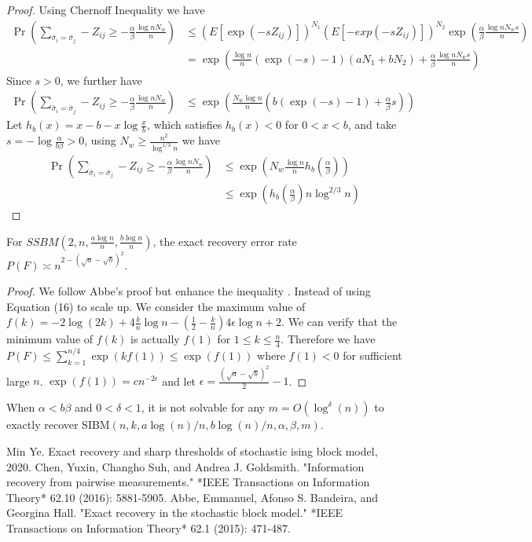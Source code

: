 \documentclass{article}
\begin{document}
\begin{proof}
	Using Chernoff Inequality we have
	\begin{align*}
	\Pr(\sum_{ \bar{\sigma}_i  = \bar{\sigma}_j } -Z_{ij} \geq -\frac{\alpha}{\beta}\frac{\log n N_w}{n})& \leq (E[\exp(-s Z_{ij})])^{N_1} (E[-exp(-s Z_{ij})])^{N_2} \exp(\frac{\alpha}{\beta} \frac{\log n N_w s}{n}) \\
	&= \exp( \frac{\log n}{n}(\exp(-s)-1)(aN_1 + bN_2)+\frac{\alpha}{\beta} \frac{\log n N_w s}{n}) 
	\end{align*}
	Since $s > 0$, we further have
	\begin{align*}
		\Pr(\sum_{ \bar{\sigma}_i  = \bar{\sigma}_j } -Z_{ij} \geq -\frac{\alpha}{\beta}\frac{\log n N_w}{n})
		& \leq \exp( \frac{N_w\log n }{n}(b(\exp(-s)-1)+ \frac{\alpha}{\beta}s)) 
	\end{align*}
	Let $h_b(x) = x - b -x\log \frac{x}{b}$, which satisfies $h_b(x) < 0$ for $0<x<b$,
	and take $s=-\log\frac{\alpha}{b\beta} > 0$, using 
	$N_w \geq \frac{n^2}{\log^{1/3} n}$ we have
	\begin{align*}
\Pr(\sum_{ \bar{\sigma}_i  = \bar{\sigma}_j } -Z_{ij} \geq -\frac{\alpha}{\beta}\frac{\log n N_w}{n})&\leq \exp( N_w \frac{\log n}{n} h_b(\frac{\alpha}{\beta})) \\
		& \leq \exp (h_b(\frac{\alpha}{\beta}) n \log^{2/3} n )
	\end{align*}
\end{proof}
\begin{lemma}
	For $SSBM(2,n, \frac{a\log n}{n}, \frac{b \log n}{n})$, the exact recovery error rate $P(F)\asymp n^{2-(\sqrt{a} - \sqrt{b})^2}$.
\end{lemma}
\begin{proof}
	We follow Abbe's proof but enhance the inequality \cite{abbe}.
	Instead of using Equation (16) to scale up. We consider the maximum value of $f(k)= -2\log(2k)
	+4\frac{k}{n}\log n - (\frac{1}{2}- \frac{k}{n})4\epsilon \log n + 2$.
	We can verify that the minimum value of $f(k)$ is actually $f(1)$ for $1\leq k \leq \frac{n}{4}$.
	Therefore we have
	$ P(F) \leq \sum_{k=1}^{n/4} \exp(kf(1)) \leq \exp(f(1))$ where $f(1) < 0 $ for sufficient large $n$.
	$\exp(f(1)) = c n^{-2\epsilon}$ and let $\epsilon = \frac{(\sqrt{a}-\sqrt{b})^2}{2} - 1$.
\end{proof}
\begin{theorem}
	When $\alpha < b \beta $ and $0 < \delta < 1$, it is not solvable for any $m= O(\log^{\delta}(n))$ to
	exactly recover SIBM$(n,k,a \log(n)/n, b\log(n)/n ,\alpha, \beta, m)$.
\end{theorem}
\begin{thebibliography}{1}
	

	Min Ye.
	\newblock Exact recovery and sharp thresholds of stochastic ising block model,
	2020.
	Chen, Yuxin, Changho Suh, and Andrea J. Goldsmith. "Information recovery from pairwise measurements." *IEEE Transactions on Information Theory* 62.10 (2016): 5881-5905.
	Abbe, Emmanuel, Afonso S. Bandeira, and Georgina Hall. "Exact recovery in the stochastic block model." *IEEE Transactions on Information Theory* 62.1 (2015): 471-487.
\end{thebibliography}
\end{document}
